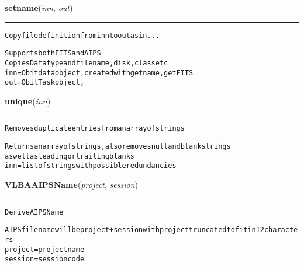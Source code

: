     \begin{boxedminipage}{\textwidth}

    \raggedright \textbf{setname}(\textit{inn}, \textit{out})

    \vspace{-1.5ex}

    \rule{\textwidth}{0.5\fboxrule}
\begin{alltt}
Copy file definition from inn to out as in...

Supports both FITS and AIPS
Copies Data type and file name, disk, class etc
inn  = Obit data object, created with getname, getFITS
out  = ObitTask object,\end{alltt}

    \vspace{1ex}

    \end{boxedminipage}

    \label{VLBACal:unique}
    \vspace{0.5ex}

    \begin{boxedminipage}{\textwidth}

    \raggedright \textbf{unique}(\textit{inn})

    \vspace{-1.5ex}

    \rule{\textwidth}{0.5\fboxrule}
\begin{alltt}
Removes duplicate entries from an array of strings

Returns an array of strings, also removes null and blank strings
as well as leading or trailing blanks
inn  = list of strings with possible redundancies\end{alltt}

    \vspace{1ex}

    \end{boxedminipage}

    \label{VLBACal:VLBAAIPSName}
    \vspace{0.5ex}

    \begin{boxedminipage}{\textwidth}

    \raggedright \textbf{VLBAAIPSName}(\textit{project}, \textit{session})

    \vspace{-1.5ex}

    \rule{\textwidth}{0.5\fboxrule}
\begin{alltt}
Derive AIPS Name

AIPS file name will be project+session with project truncated to fit in 12 characters
project    = project name
session    = session code\end{alltt}

    \vspace{1ex}

    \end{boxedminipage}

